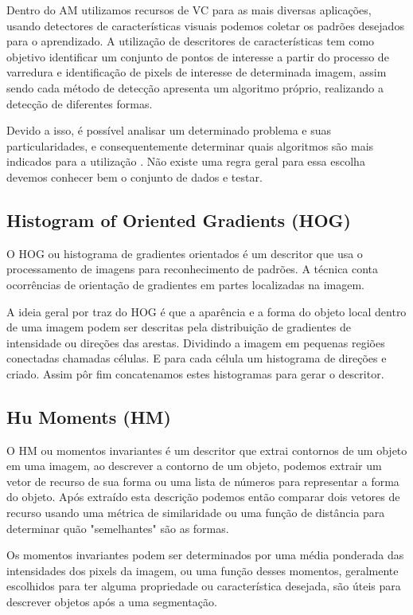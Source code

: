 Dentro do AM utilizamos recursos de VC para as mais diversas aplicações, usando detectores de características visuais podemos coletar os padrões desejados para o aprendizado. A utilização de descritores de características tem como objetivo identificar um conjunto de pontos de interesse a partir do processo de varredura e identificação de pixels de interesse de determinada imagem, assim sendo cada método de detecção apresenta um algoritmo próprio, realizando a detecção de diferentes formas. 

Devido a isso, é possível analisar um determinado problema e suas particularidades, e consequentemente determinar quais algoritmos são mais indicados para a utilização \cite{Sonka1998}. Não existe uma regra geral para essa escolha devemos conhecer bem o conjunto de dados e testar. 

\subsection{Histogram of Oriented Gradients (HOG)} 

O HOG ou histograma de gradientes orientados é um descritor que usa o processamento de imagens para reconhecimento de padrões. A técnica conta ocorrências de orientação de gradientes em partes localizadas na imagem. 

A ideia geral por traz do HOG é que a aparência e a forma do objeto local dentro de uma imagem podem ser descritas pela distribuição de gradientes de intensidade ou direções das arestas. Dividindo a imagem em pequenas regiões conectadas chamadas células. E para cada célula um histograma de direções e criado. Assim pôr fim concatenamos estes histogramas para gerar o descritor. 

\subsection{Hu Moments (HM)} 

O HM ou momentos invariantes é um descritor que extrai contornos de um objeto em uma imagem, ao descrever a contorno de um objeto, podemos extrair um vetor de recurso de sua forma ou uma lista de números para representar a forma do objeto. Após extraído esta descrição podemos então comparar dois vetores de recurso usando uma métrica de similaridade ou uma função de distância para determinar quão "semelhantes" são as formas. 

Os momentos invariantes podem ser determinados por uma média ponderada das intensidades dos pixels da imagem, ou uma função desses momentos, geralmente escolhidos para ter alguma propriedade ou característica desejada, são úteis para descrever objetos após a uma segmentação. 

